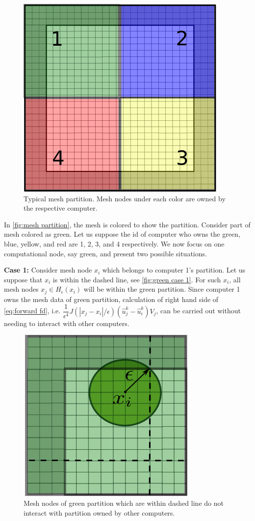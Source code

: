 \documentclass[11pt,twocolumn]{amsart}
\theoremstyle{definition}
\theoremstyle{definition}
\numberwithin{equation}{section}
\numberwithin{equation}{section}
\begin{document}
\begin{figure}
\centering
\includegraphics[scale=0.6]{mesh_partition.png}
\caption{Typical mesh partition. Mesh nodes under each color are owned by the respective computer.}\label{fig:mesh partition}
\end{figure}

In \autoref{fig:mesh partition}, the mesh is colored to show the partition. Consider part of mesh colored as green. Let us suppose the id of computer who owns the green, blue, yellow, and red are 1, 2, 3, and 4 respectively. We now focus on one computational node, say green, and present two possible situations.

\textbf{Case 1: }Consider mesh node $x_i$ which belongs to computer 1's partition. Let us suppose that $x_i$ is within the dashed line, see \autoref{fig:green case 1}. For such $x_i$, all mesh nodes $x_j \in H_\epsilon(x_i)$  will be within the green partition. Since computer 1 owns the mesh data of green partition, calculation of right hand side of \autoref{eq:forward fd}, i.e. $\dfrac{1}{\epsilon^4} J(|x_j - x_i|/\epsilon)(\hat{u}^k_j - \hat{u}^k_i)V_j$, can be carried out without needing to interact with other computers. 

\begin{figure}[ht]
\centering
\includegraphics[scale=0.5]{mesh_partition_green_case_1.png}
\caption{Mesh nodes of green partition which are within dashed line do not interact with partition owned by other computers.}\label{fig:green case 1}
\end{figure}
\end{document}
